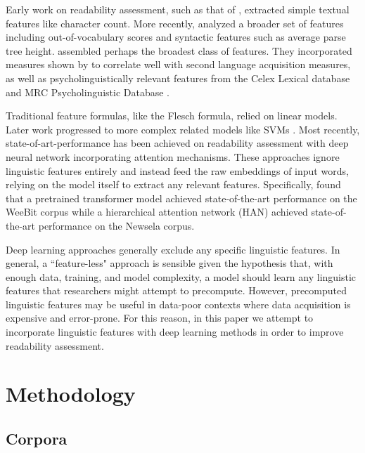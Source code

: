 \documentclass[11pt,a4paper]{article}
\theoremstyle{definition}
\begin{document}
Early work on readability assessment, such as that of \citet{fleschNewReadabilityYardstick1948}, extracted simple textual features like character count. More recently, \citet{schwarmReadingLevelAssessment2005} analyzed a broader set of features including out-of-vocabulary scores and syntactic features such as average parse tree height. \citet{vajjalaImprovingAccuracyReadability2012} assembled perhaps the broadest class of features. They incorporated measures shown by \citet{luAutomaticAnalysisSyntactic2010} to correlate well with second language acquisition measures, as well as psycholinguistically relevant features from the Celex Lexical database and MRC Psycholinguistic Database \citep{Baayen1995TheCL, wilsonMRCPsycholinguisticDatabase1988}.

Traditional feature formulas, like the Flesch formula, relied on linear models. Later work progressed to more complex related models like SVMs \citep{schwarmReadingLevelAssessment2005}. Most recently, state-of-art-performance has been achieved on readability assessment with deep neural network incorporating attention mechanisms. These approaches ignore linguistic features entirely and instead feed the raw embeddings of input words, relying on the model itself to extract any relevant features. Specifically, \citet{martincSupervisedUnsupervisedNeural2019} found that a pretrained transformer model achieved state-of-the-art performance on the WeeBit corpus while a hierarchical attention network (HAN) achieved state-of-the-art performance on the Newsela corpus.



Deep learning approaches generally exclude any specific linguistic features. In general, a ``feature-less" approach is sensible given the hypothesis that, with enough data, training, and model complexity, a model should learn any linguistic features that researchers might attempt to precompute. However, precomputed linguistic features may be useful in data-poor contexts where data acquisition is expensive and error-prone.  For this reason, in this paper we attempt to incorporate linguistic features with deep learning methods in order to improve readability assessment.

\section{Methodology}
\label{sec:methodology}
\subsection{Corpora}
\label{sec:methodCorpora}
\end{document}
